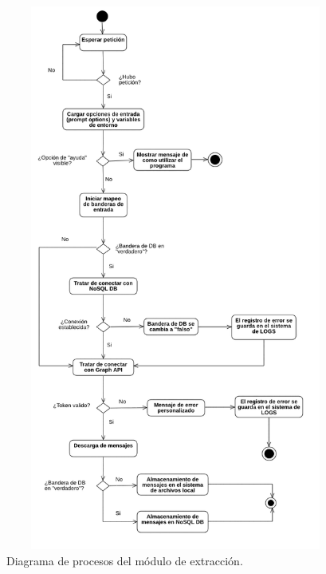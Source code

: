         \begin{figure}[H]
             \centering
             \includegraphics[height=18cm, width=16.5cm]{Latex/Classes/Imagenes/Scraper.png}
             \caption{Diagrama de procesos del módulo de extracción.}
             \label{fig:dp-scraper}
        \end{figure}
